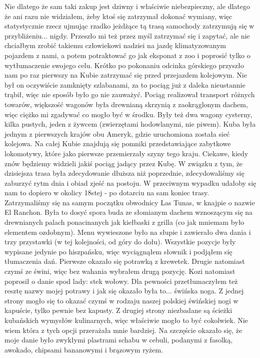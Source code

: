 Nie dlatego że sam taki zakup jest dziwny i właściwie niebezpieczny, ale dlatego że ani razu nie widziałem, żeby ktoś się zatrzymał dokonać wymiany, więc statystycznie rzecz ujmując rzadko jeżdżące tą trasą samochody zatrzymują się w przybliżeniu...
nigdy.
Przeszło mi też przez myśl zatrzymać się i zapytać, ale nie chciałbym zrobić takiemu człowiekowi nadziei na jazdę klimatyzowanym pojazdem z nami, a potem potraktować go jak eksponat z zoo i poprosić tylko o wytłumaczenie swojego celu.
Krótko po pokonaniu odcinka górskiego przyszło nam po raz pierwszy na Kubie zatrzymać się przed przejazdem kolejowym.
Nie był on oczywiście zamknięty szlabanami, za to pociąg już z daleka nieustannie trąbił, więc nie sposób było go nie zauważyć.
Pociąg realizował transport różnych towarów, większość wagonów była drewnianą skrzynią z zaokrąglonym dachem, więc ciężko mi zgadywać co mogło być w środku.
Były też dwa wagony cysterny, kilka pustych, jeden z żywcem (zwierzętami hodowlanymi, nie piwem).
Kuba była jednym z pierwszych krajów obu Ameryk, gdzie uruchomiona została sieć kolejowa.
Na całej Kubie znajdują się pomniki przedstawiające zabytkowe lokomotywy, które jako pierwsze przemierzały szyny tego kraju.
Ciekawe, kiedy znów będziemy widzieli jakiś pociąg jadący przez Kubę.
W związku z tym, że dzisiejsza trasa była zdecydowanie dłuższa niż poprzednie, zdecydowaliśmy się zaburzyć rytm dnia i obiad zjeść na postoju.
W przeciwnym wypadku udałoby się nam to dopiero w okolicy 18stej - po dotarciu na sam koniec trasy.
Zatrzymaliśmy się na samym początku obwodnicy Las Tunas, w knajpie o nazwie El Ranchon.
Była to dosyć spora buda ze słomianym dachem wznoszącym się na drewnianych palach ponacinanych jak kiełbaski z grilla (co jak mniemam było elementem ozdobnym).
Menu wywieszone było na słupie i zawierało dwa dania i trzy przystawki (w tej kolejności, od góry do dołu).
Wszystkie pozycje były wypisane jedynie po hiszpańsku, więc wyciągnąłem słownik i podjąłem się tłumaczenia dań.
Pierwsze okazało się potrawką z krewetek.
Drugie natomiast czymś ze świni, więc bez wahania wybrałem drugą pozycję.
Kozi natomiast poprosił o danie spod lady: stek wołowy.
Dla pewności przetłumaczyłem też resztę nazwy mojej potrawy i jak się okazało była to...
świńska noga.
Z jednej strony mogło się to okazać czymś w rodzaju naszej polskiej świńskiej nogi w kapuście, tylko pewnie bez kapusty.
Z drugiej strony niezbadane są ścieżki kubańskich wymysłów kulinarnych, więc właściwie mogło to być cokolwiek.
Nie wiem która z tych opcji przerażała mnie bardziej.
Na szczęście okazało się, że moje danie było zwykłymi plastrami schabu w cebuli, podanymi z fasolką, awokado, chipsami bananowymi i brązowym ryżem.
